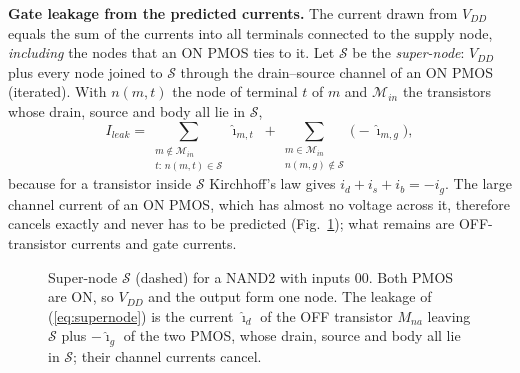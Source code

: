 \textbf{Gate leakage from the predicted currents.} The current drawn from $V_{DD}$ equals the sum of the currents into all terminals connected to the supply node, \emph{including} the nodes that an ON PMOS ties to it. Let $\mathcal S$ be the \emph{super-node}: $V_{DD}$ plus every node joined to $\mathcal S$ through the drain--source channel of an ON PMOS (iterated). With $n(m,t)$ the node of terminal $t$ of $m$ and $\mathcal M_{in}$ the transistors whose drain, source and body all lie in $\mathcal S$,
\begin{equation}
I_{leak}=\sum_{\substack{m\notin\mathcal M_{in}\\ t:\,n(m,t)\in\mathcal S}}\hat\imath_{m,t}\;+\sum_{\substack{m\in\mathcal M_{in}\\ n(m,g)\notin\mathcal S}}\bigl(-\hat\imath_{m,g}\bigr),
\label{eq:supernode}
\end{equation}
because for a transistor inside $\mathcal S$ Kirchhoff's law gives $i_d+i_s+i_b=-i_g$. The large channel current of an ON PMOS, which has almost no voltage across it, therefore cancels exactly and never has to be predicted (Fig.~\ref{fig:supernode}); what remains are OFF-transistor currents and gate currents.
\begin{figure}[t]
\centering
{}
\caption{Super-node $\mathcal S$ (dashed) for a NAND2 with inputs 00. Both PMOS are ON, so $V_{DD}$ and the output form one node. The leakage of (\ref{eq:supernode}) is the current $\hat\imath_d$ of the OFF transistor $M_{na}$ leaving $\mathcal S$ plus $-\hat\imath_g$ of the two PMOS, whose drain, source and body all lie in $\mathcal S$; their channel currents cancel.}
\label{fig:supernode}
\end{figure}

